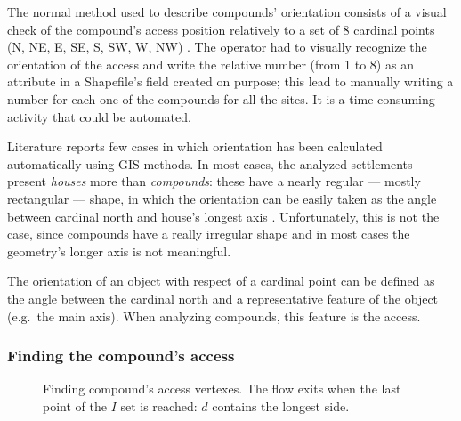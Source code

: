             The normal method used to describe compounds' orientation consists of a visual check of the compound's access position relatively to a set of 8 cardinal points (N, NE, E, SE, S, SW, W, NW) \cite{laterza}. The operator had to visually recognize the orientation of the access and write the relative number (from 1 to 8) as an attribute in a Shapefile's field created on purpose; this lead to manually writing a number for each one of the compounds for all the sites. It is a time-consuming activity that could be automated.

            Literature reports few cases in which orientation has been calculated automatically using GIS methods. In most cases, the analyzed settlements present \emph{houses} more than \emph{compounds}: these have a nearly regular --- mostly rectangular --- shape, in which the orientation can be easily taken as the angle between cardinal north and house's longest axis \cite[p.~53]{spatial-south-europe}. Unfortunately, this is not the case, since compounds have a really irregular shape and in most cases the geometry's longer axis is not meaningful.

            The orientation of an object with respect of a cardinal point can be defined as the angle between the cardinal north and a representative feature of the object (e.g.\ the main axis). When analyzing compounds, this feature is the access.

            \subsubsection{Finding the compound's access}

                \begin{wrapfigure}{r}{0.45\textwidth}
                    \vspace{-0.08\textheight}
                    \centering
                    \begin{tikzpicture}[x=1mm,y=1mm,scale=0.005]
                        
                    \end{tikzpicture}
                    \caption[Logic process to determine the compound's access.]{Finding compound's access vertexes. The flow exits when the last point of the $I$ set is reached: $d$ contains the longest side.}
                    \label{fig:flow-access}
                    \vspace{-0.04\textheight}
                \end{wrapfigure}

